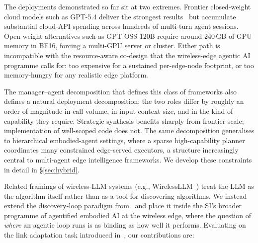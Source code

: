 \documentclass[journal]{IEEEtran}
\begin{document}
The deployments demonstrated so far sit at two extremes. Frontier closed-weight cloud models such as GPT-5.4 deliver the strongest results~\cite{aitaoudia2026aite} but accumulate substantial cloud-API spending across hundreds of multi-turn agent sessions. Open-weight alternatives such as GPT-OSS 120B require around 240\,GB of GPU memory in BF16, forcing a multi-GPU server or cluster. Either path is incompatible with the resource-aware co-design that the wireless-edge agentic AI programme calls for: too expensive for a sustained per-edge-node footprint, or too memory-hungry for any realistic edge platform.

The manager--agent decomposition that defines this class of frameworks also defines a natural deployment decomposition: the two roles differ by roughly an order of magnitude in call volume, in input context size, and in the kind of capability they require. Strategic synthesis benefits sharply from frontier scale; implementation of well-scoped code does not. The same decomposition generalises to hierarchical embodied-agent settings, where a sparse high-capability planner coordinates many constrained edge-served executors, a structure increasingly central to multi-agent edge intelligence frameworks. We develop these constraints in detail in \S\ref{sec:hybrid}.

Related framings of wireless-LLM systems (e.g., WirelessLLM~\cite{shao2024wirelessllm}) treat the LLM as the algorithm itself rather than as a tool for discovering algorithms. We instead extend the discovery-loop paradigm from~\cite{aitaoudia2026aite} and place it inside the SI's broader programme of agentified embodied AI at the wireless edge, where the question of \emph{where} an agentic loop runs is as binding as how well it performs. Evaluating on the link adaptation task introduced in~\cite{aitaoudia2026aite}, our contributions are:
\end{document}
